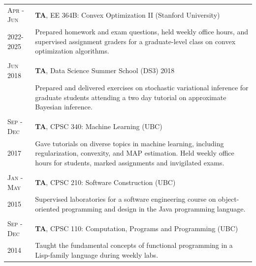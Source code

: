 \documentclass[10pt]{article}
\begin{document}
\begin{longtable}
    {R{1.8cm}|L{11.8cm}}
    \textsc{Apr - Jun}
     & \textbf{TA}, EE 364B: Convex Optimization II (Stanford University)            \\
    \vspace{0.3cm}2022-2025
     & {\small Prepared homework and exam questions, held weekly office hours,
           and supervised assignment graders for a graduate-level class on convex
           optimization algorithms.}     \\
                                                                 \\
    \textsc{ Jun 2018}
     & \textbf{TA}, Data Science Summer School (DS3) 2018                            \\
     & {\small Prepared and delivered exercises on stochastic variational
           inference for graduate students attending a two day tutorial on
           approximate Bayesian inference.}            \\
                                                                 \\
    \textsc{Sep - Dec}
     & \textbf{TA}, CPSC 340: Machine Learning                          (UBC)        \\
    \vspace{0.7cm} 2017
     & {\small Gave tutorials on diverse topics in machine learning, including
           regularization, convexity, and MAP estimation.  Held weekly office hours
           for students, marked assignments and invigilated exams.  }
    \\
                                                                 \\
    \textsc{Jan - May}
     & \textbf{TA}, CPSC 210: Software Construction                     (UBC)        \\
    \vspace{0.2cm}2015
     & {\small Supervised laboratories for a software engineering course on
           object-oriented programming and design in the Java programming language.}
    \\
                                                                 \\
    \textsc{Sep - Dec}
     & \textbf{TA}, CPSC 110: Computation, Programs and Programming     (UBC)        \\
    \vspace{0.3cm}2014
     & {\small Taught the fundamental concepts of functional programming in a
           Lisp-family language during weekly labs.}
\end{longtable}
\end{document}
